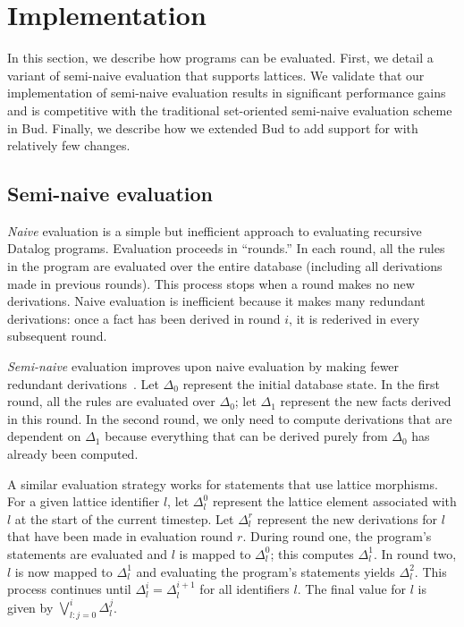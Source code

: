 \section{Implementation}
\label{sec:impl}

In this section, we describe how \lang programs can be evaluated. First, we
detail a variant of semi-naive evaluation that supports lattices. We validate
that our implementation of semi-naive evaluation results in significant
performance gains and is competitive with the traditional set-oriented
semi-naive evaluation scheme in Bud. Finally, we describe how we extended Bud to
add support for \lang with relatively few changes.

\subsection{Semi-naive evaluation}
\label{sec:lattice-eval-strat}
\emph{Naive} evaluation is a simple but inefficient approach to evaluating
recursive Datalog programs. Evaluation proceeds in ``rounds.'' In each round, all
the rules in the program are evaluated over the entire database (including all
derivations made in previous rounds). This process stops when a round makes no
new derivations. Naive evaluation is inefficient because it makes many redundant
derivations: once a fact has been derived in round $i$, it is rederived in every
subsequent round.

\emph{Semi-naive} evaluation improves upon naive evaluation by making fewer
redundant derivations~\cite{Balbin1987}. Let $\Delta_0$ represent the initial
database state. In the first round, all the rules are evaluated over $\Delta_0$;
let $\Delta_1$ represent the new facts derived in this round. In the second
round, we only need to compute derivations that are dependent on $\Delta_1$
because everything that can be derived purely from $\Delta_0$ has already been
computed.

A similar evaluation strategy works for \lang statements that use lattice
morphisms. For a given lattice identifier $l$, let $\Delta_l^0$ represent the
lattice element associated with $l$ at the start of the current timestep. Let
$\Delta^r_l$ represent the new derivations for $l$ that have been made in
evaluation round $r$. During round one, the program's statements are evaluated
and $l$ is mapped to $\Delta_l^0$; this computes $\Delta^1_l$. In round two, $l$
is now mapped to $\Delta^1_l$ and evaluating the program's statements yields
$\Delta^2_l$. This process continues until $\Delta^i_l = \Delta^{i+1}_l$ for all
identifiers $l$.  The final value for $l$ is given by $\bigvee_{l: j=0}^i
\Delta^j_l$.

